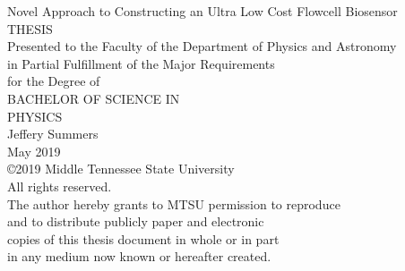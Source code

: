 \documentclass{article}%
\begin{document}
\begin{center}
{\Large\selectfont
    Novel Approach to Constructing an Ultra Low Cost Flowcell Biosensor\\
}
\vspace{2cm}
{\large\selectfont
    THESIS\\
}
\vspace{2.2cm}
{\large\selectfont
    Presented to the Faculty of the Department of Physics and Astronomy\\
    in Partial Fulfillment of the Major Requirements\\
    for the Degree of\\
}
\vspace{2.4cm}
{\large\selectfont
    BACHELOR OF SCIENCE IN\\
    PHYSICS\\
}
\vspace{2.4cm}
{\selectfont
    Jeffery Summers\\
}
\vspace{2.4cm}
{\selectfont
    May 2019\\
}
\vspace{2.4cm}
{\large\selectfont
    \copyright 2019 Middle Tennessee State University\\
    All rights reserved.\\
}
\vspace{0.4cm}
{\small\selectfont
    The author hereby grants to MTSU permission to reproduce\\
    and to distribute publicly paper and electronic\\
    copies of this thesis document in whole or in part\\
    in any medium now known or hereafter created.\\
}
\end{center}
\pagestyle{empty}

\pagebreak
\end{document}
